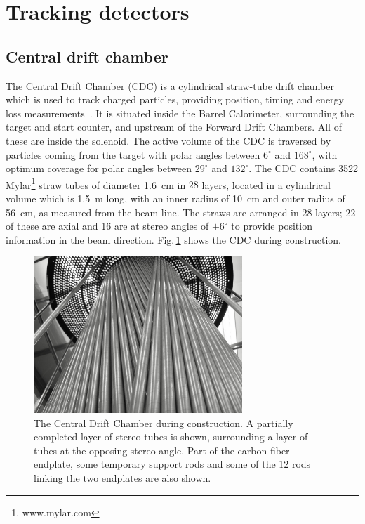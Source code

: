 \section{Tracking detectors \label{sec:tracking}}
\subsection[Central drift chamber (Naomi)]{Central drift chamber \label{sec:cdc}}

The Central Drift Chamber (CDC) is a cylindrical straw-tube drift chamber which is used to track charged particles, providing position, timing and energy loss measurements~\cite{GlueXCDCNIM}.
It is situated inside the Barrel Calorimeter, surrounding the target and start counter, and upstream of the Forward Drift Chambers. 
All of these are inside the solenoid. 
The active volume of the CDC is traversed
by particles coming from the target with polar angles between $6^{\circ}$ and $168^{\circ}$, with optimum 
coverage for polar angles between $29^{\circ}$ and $132^{\circ}$.  
The CDC contains 3522 Mylar\footnote{www.mylar.com} straw tubes of diameter 1.6~cm in $28$ layers,
located in a cylindrical volume which is 1.5~m long, with an inner radius of 10~cm and outer radius of 56~cm, as measured from the beam-line.  
The straws are arranged in 28 layers; 22 of these are axial and 16 are at stereo angles of $\pm 6^{\circ}$ to provide position information in the beam direction. Fig.\,\ref{fig:CDC_stereotubes}  shows the CDC during construction. 

\begin{figure}[tbp]
\begin{center}
\includegraphics[width=0.7\textwidth]{figures/CDC_stereotubes}  
\caption{\label{fig:CDC_stereotubes}          
  The Central Drift Chamber during construction. A partially completed layer of stereo tubes is shown, surrounding a layer of tubes at the opposing stereo angle. Part of the carbon fiber endplate, some temporary support rods and some of the 12 rods linking the two endplates are also shown.}  
\end{center}
\end{figure}

